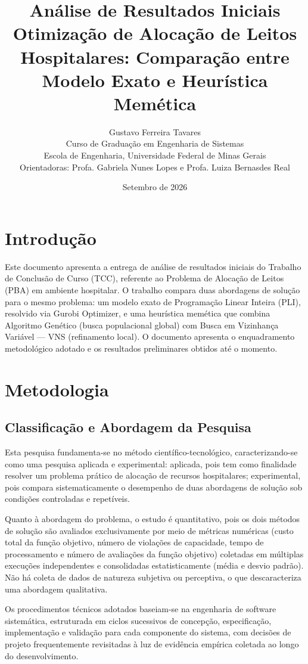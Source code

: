 \documentclass[12pt,a4paper]{article}
\title{Análise de Resultados Iniciais\\[0.3em]
\large Otimização de Alocação de Leitos Hospitalares: Comparação entre Modelo Exato e Heurística Memética}
\author{Gustavo Ferreira Tavares\\
Curso de Graduação em Engenharia de Sistemas\\
Escola de Engenharia, Universidade Federal de Minas Gerais\\
Orientadoras: Profa. Gabriela Nunes Lopes e Profa. Luiza Bernasdes Real}
\date{Setembro de 2026}
\begin{document}
\maketitle

\section*{Introdução}

Este documento apresenta a entrega de análise de resultados iniciais do Trabalho de
Conclusão de Curso (TCC), referente ao Problema de Alocação de Leitos (PBA) em
ambiente hospitalar. O trabalho compara duas abordagens de solução para o mesmo
problema: um modelo exato de Programação Linear Inteira (PLI), resolvido via Gurobi
Optimizer, e uma heurística memética que combina Algoritmo Genético (busca
populacional global) com Busca em Vizinhança Variável — VNS (refinamento local). O
documento apresenta o enquadramento metodológico
adotado e os resultados preliminares obtidos até o momento.

\section{Metodologia}

\subsection{Classificação e Abordagem da Pesquisa}

Esta pesquisa fundamenta-se no método científico-tecnológico, caracterizando-se
como uma pesquisa aplicada e experimental: aplicada, pois tem como finalidade
resolver um problema prático de alocação de recursos hospitalares; experimental,
pois compara sistematicamente o desempenho de duas abordagens de solução sob
condições controladas e repetíveis.

Quanto à abordagem do problema, o estudo é quantitativo, pois os dois
métodos de solução são avaliados exclusivamente por meio de métricas numéricas (custo total da função objetivo, número de violações de capacidade, tempo de
processamento e número de avaliações da função objetivo) coletadas em múltiplas
execuções independentes e consolidadas estatisticamente (média e desvio padrão).
Não há coleta de dados de natureza subjetiva ou perceptiva, o que descaracteriza uma
abordagem qualitativa.

Os procedimentos técnicos adotados baseiam-se na engenharia de software
sistemática, estruturada em ciclos sucessivos de concepção, especificação,
implementação e validação para cada componente do sistema, com decisões de projeto
frequentemente revisitadas à luz de evidência empírica coletada ao longo do
desenvolvimento.
\end{document}
